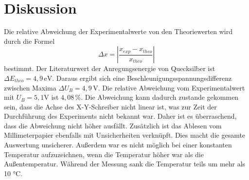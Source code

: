 \section{Diskussion}
\label{sec:Diskussion}
Die relative Abweichung der Experimentalwerte von 
den Theoriewerten wird durch die Formel 
$$\Delta x = \left|\frac{x_{exp} - x_{theo}}{x_{theo}} \right|$$
bestimmt. 
Der Literaturwert der Anregungsenergie von Quecksilber 
ist $\Delta E_{theo} = 4,9 \, \unit{\eV}$. Daraus ergibt 
sich eine Beschleunigungsspannungsdifferenz zwischen Maxima 
$\Delta U_B = 4,9 \, \unit{\volt}$. Die relative Abweichung 
vom Experimentalwert mit $U_B = 5,1 \unit{\volt}$ ist $4,08 \, \%$. 
Die Abweichung kann dadurch zustande gekommen sein, dass die Achse des X-Y-Schreiber 
nicht linear ist, was zur Zeit der Durchführung des Experiments nicht bekannt war. 
Daher ist es überraschend, dass die Abweichung nicht höher ausfällt. Zusätzlich ist das Ablesen 
vom Millimeterpapier ebenfalls mit Unsicherheiten verknüpft. 
Dies macht die gesamte Auswertung unsicherer. Außerdem war es nicht 
möglich bei einer konstanten Temperatur aufzuzeichnen, wenn die Temperatur 
höher war als die Außentemperatur. Während der Messung sank die Temperatur 
teils um mehr als 10 °C. 